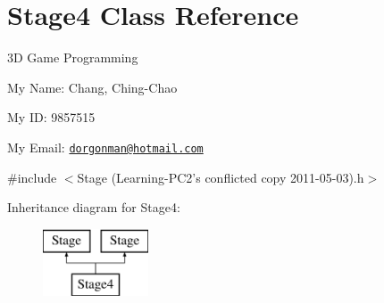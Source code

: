 \hypertarget{class_stage4}{
\section{Stage4 Class Reference}
\label{class_stage4}
}


3D Game Programming\par
 My Name: Chang, Ching-\/Chao\par
 My ID: 9857515\par
 My Email: \href{mailto:dorgonman@hotmail.com}{\tt dorgonman@hotmail.com}  




{\ttfamily \#include $<$Stage (Learning-\/PC2's conflicted copy 2011-\/05-\/03).h$>$}

Inheritance diagram for Stage4:\begin{figure}[H]
\begin{center}
\leavevmode
\includegraphics[height=2.000000cm]{class_stage4}
\end{center}
\end{figure}
